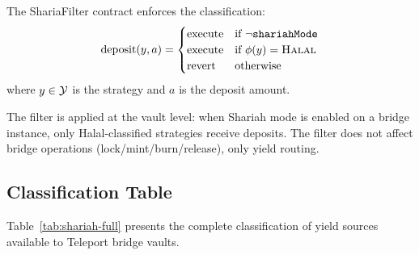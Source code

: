 \begin{definition}
\label{def:filter}
The ShariaFilter contract enforces the classification:
\begin{equation}
  \text{deposit}(y, a) =
  \begin{cases}
    \text{execute} & \text{if } \neg\texttt{shariahMode} \\
    \text{execute} & \text{if } \phi(y) = \textsc{Halal} \\
    \text{revert} & \text{otherwise}
  \end{cases}
\end{equation}
where $y \in \mathcal{Y}$ is the strategy and $a$ is the deposit amount.
\end{definition}

The filter is applied at the vault level: when Shariah mode is enabled on a bridge instance, only Halal-classified strategies receive deposits. The filter does not affect bridge operations (lock/mint/burn/release), only yield routing.

\subsection{Classification Table}

Table~\ref{tab:shariah-full} presents the complete classification of yield sources available to Teleport bridge vaults.

